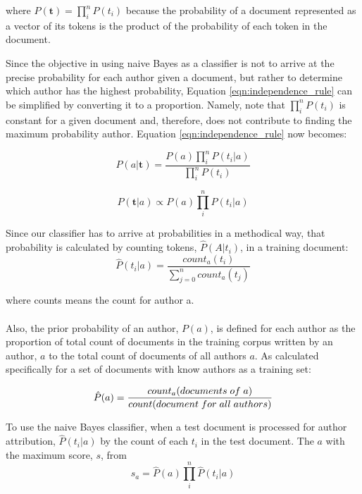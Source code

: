 		
		where $P(\mathbf{t}) = \prod_i^n P(t_i)$ because the probability of a document represented as a vector of its tokens is the product of the probability of each token in the document.
		
		Since the objective in using naive Bayes as a classifier is not to arrive at the precise probability for each author given a document, but rather to determine which author has the highest probability, Equation \ref{eqn:independence_rule} can be simplified by converting it to a proportion.  Namely, note that $\prod_i^n P(t_i) $ is constant for a given document and, therefore, does not contribute to finding the maximum probability author.  Equation \ref{eqn:independence_rule} now becomes:
		
		\begin{equation} \label{eqn:independence_rule} P(a|\mathbf{t}) = \frac{P(a) \prod_i^n P(t_i|a)}{\prod_i^n P(t_i)} \end{equation}
		
		\begin{equation} P(\mathbf{t}|a) \propto P(a) \prod_i^n P(t_i|a) \end{equation}
		
		Since our classifier has to arrive at probabilities in a methodical way, that probability is calculated by counting tokens, $\hat{P}(A|t_i)$, in a training document:
		\begin{equation} \hat{P}(t_i|a) = \frac{count_a(t_i)}{\sum_{j=0}^n count_a(t_j)} \end{equation}
		
		where counts means the count for author a.
		
		\paragraph*{} Also, the prior probability of an author, $P(a)$, is defined for each author as the proportion of total count of documents in the training corpus written by an author, $a$ to the total count of documents of all authors $a$. As calculated specifically for a set of documents with know authors as a training set:
		
		\begin{equation} \hat{P}(a) = \frac{count_a(documents \thickspace of \thickspace a)}{count(document \thickspace for \thickspace all \thickspace authors)} \end{equation}		
		
		To use the naive Bayes classifier, when a test document is processed for author attribution, $\hat{P}(t_i|a)$ by the count of each $t_i$ in the test document.  The $a$ with the maximum score, $s$, from 
		\begin{equation} \label{eqn:p_hat_def}s_a = \hat{P}(a) \prod_i^n \hat{P}(t_i|a) \end{equation}
		
